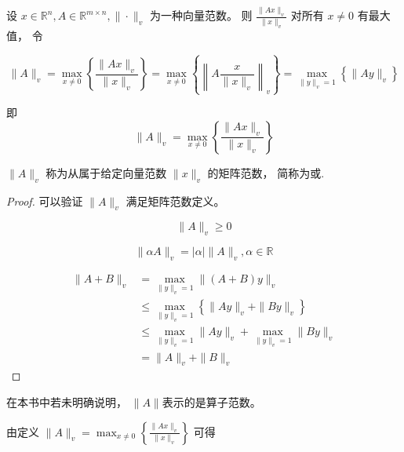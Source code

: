 \begin{definition}
    设 $ x \in \mathbb{R}^{n}, A \in \mathbb{R}^{m \times n},\|\cdot\|_{v} $ 为一种向量范数。 则 $ \frac{\|A x\|_{v}}{\|x\|_{v}} $ 对所有 $ x \neq 0 $ 有最大值， 令

    \begin{equation} \|A\|_{v}=\max _{x \neq 0}\left\{\frac{\|A x\|_{v}}{\|x\|_{v}}\right\}=\max _{x \neq 0}\left\{\left\|A \frac{x}{\|x\|_{v}}\right\|_{v}\right\}=\max _{\|y\|_{v}=1}\left\{\|A y\|_{v}\right\} \end{equation}

    即\begin{equation} \|A\|_{v}=\max _{x \neq 0}\left\{\frac{\|A x\|_{v}}{\|x\|_{v}}\right\} \end{equation}

    $ \|A\|_{v} $ 称为从属于给定向量范数 $ \|x\|_{v} $ 的矩阵范数， 简称为或.
\end{definition}

\begin{proof}
    可以验证 $ \|A\|_{v} $ 满足矩阵范数定义。 

    \begin{equation} \|A\|_{v} \geq 0 \end{equation}

    \begin{equation} \|\alpha A\|_{v}=|\alpha|\|A\|_{v}, \alpha \in \mathbb{R} \end{equation}

    \begin{equation}\begin{aligned}
        \|A+B\|_{v} &=\max _{\|y\|_{v}=1}\|(A+B) y\|_{v} \\
        &\leq \max _{\|y\|_{v}=1}\left\{\|A y\|_{v}+\|B y\|_{v}\right\} \\
        & \leq \max _{\|y\|_{v}=1}\|A y\|_{v}+\max _{\|y\|_{v}=1}\|B y\|_{v} \\
        & =\|A\|_{v}+\|B\|_{v}
    \end{aligned}\end{equation}

\end{proof}

\begin{remark}
    在本书中若未明确说明， $\|A \|$表示的是算子范数。
\end{remark}

由定义 $ \|A\|_{v}=\max _{x \neq 0}\left\{\frac{\|A x\|_{v}}{\|x\|_{v}}\right\} $ 可得


